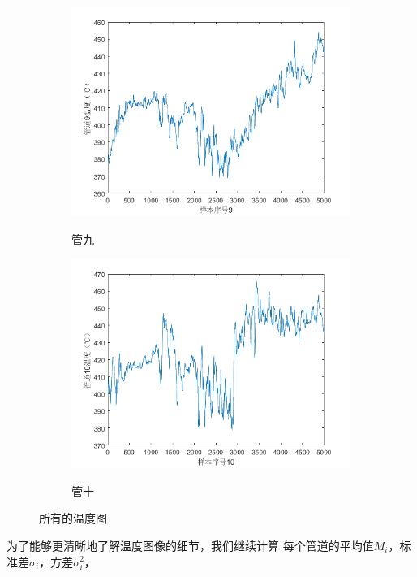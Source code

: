 \begin{figure}[H]
            \begin{subfigure}{0.40\textwidth}
                \includegraphics[width=\textwidth]{figures/p1_9.png}
                \label{p1_9}
                \caption{管九}
            \end{subfigure}
            \begin{subfigure}{0.40\textwidth}
                \includegraphics[width=\textwidth]{figures/p1_10.png}
                \label{p1_10}
                \caption{管十}
            \end{subfigure}
            \caption{所有的温度图}
        \end{figure}
        为了能够更清晰地了解温度图像的细节，我们继续计算
        每个管道的平均值$M_i$，标准差$\sigma_i$，方差$\sigma_i^2$，

